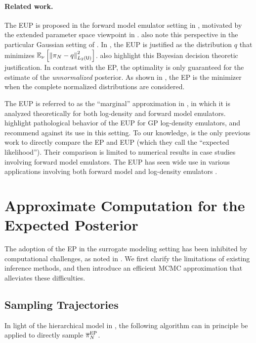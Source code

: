 \documentclass[12pt]{article}
\begin{document}
\paragraph{Related work.} The EUP is proposed in the forward model emulator setting 
in \citet{BilionisBayesSurrogates}, motivated by the extended parameter space viewpoint
in . \citet{StuartTeck2,CES} also note this perspective
in the particular Gaussian setting of .
In \citet{SinsbeckNowak}, the EUP is justified as the distribution 
$q$ that minimizes $\mathbb{E}_{\nu_{}}\left[\left\lVert\pi_{N} - q\right\rVert_{L_2(\mathsf{U})}^2 \right]$.
\citet{StuartTeck1,StuartTeck2,VehtariParallelGP} also highlight this Bayesian 
decision theoretic justification. 
In contrast with the EP, the optimality is only guaranteed for the estimate of the 
\textit{unnormalized} posterior.
As shown in , the EP is the minimizer when the complete 
normalized distributions are considered.

The EUP is referred to as the ``marginal'' approximation in 
\citet{StuartTeck1,StuartTeck2,random_fwd_models,TeckHyperpar},
in which it is analyzed theoretically for both log-density and forward 
model emulators. \citet{VehtariParallelGP} highlight pathological 
behavior of the EUP for GP log-density emulators, and recommend 
against its use in this setting. To our knowledge, \citet{BurknerSurrogate}
is the only previous work to directly compare the EP and EUP (which 
they call the ``expected likelihood''). Their comparison is limited to 
numerical results in case studies involving forward model emulators.
The EUP has seen wide 
use in various applications involving both forward model 
and log-density emulators 
\citep{weightedIVAR,GP_PDE_priors,CES,idealizedGCM,
villani2024posteriorsamplingadaptivegaussian,hydrologicalModel,hydrologicalModel2}.
 
\section{Approximate Computation for the Expected Posterior} \label{sec:computation}
The adoption of the EP in the surrogate modeling setting has been 
inhibited by computational challenges, as noted in 
\citet{VehtariParallelGP,StuartTeck2}. We first clarify the limitations
of existing inference methods, and then introduce an efficient MCMC 
approximation that alleviates these difficulties.

\subsection{Sampling Trajectories}
In light of the hierarchical model in , the following 
algorithm can in principle be applied to directly sample $\overline{\pi}_{N}^{\mathrm{EP}}$.  
\end{document}
